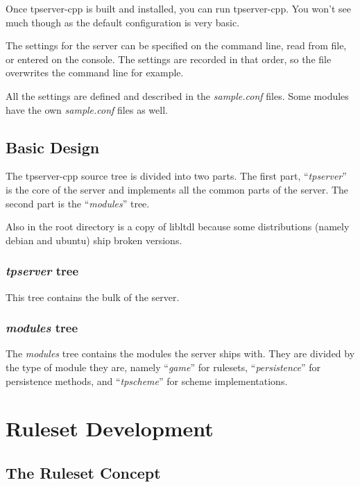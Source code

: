 \documentclass[a4paper,11pt]{report}
\newcommand{\filename}[1]{\emph{#1}}
\begin{document}
Once tpserver-cpp is built and installed, you can run tpserver-cpp.  You won't see much though as the default configuration is very basic.

The settings for the server can be specified on the command line, read from file, or entered on the console. The settings are recorded in that order, so the file overwrites the command line for example.

All the settings are defined and described in the \filename{sample.conf} files. Some modules have the own \filename{sample.conf} files as well.

\chapter{Basic Design}
\label{chap:design-basic}

The tpserver-cpp source tree is divided into two parts. The first part, ``\filename{tpserver}'' is the core of the server and implements all the common parts of the server. The second part is the ``\filename{modules}'' tree.

Also in the root directory is a copy of libltdl because some distributions (namely debian and ubuntu) ship broken versions.

\section{\filename{tpserver} tree}
\label{sec:tree-tpserver}

This tree contains the bulk of the server.

\section{\filename{modules} tree}
\label{sec:tree-modules}

The \filename{modules} tree contains the modules the server ships with. They are divided by the type of module they are, namely ``\filename{game}'' for rulesets, ``\filename{persistence}'' for persistence methods, and ``\filename{tpscheme}'' for scheme implementations.

\part{Ruleset Development}
\label{part:ruleset-dev}

\chapter{The Ruleset Concept}
\label{chap:ruleset-concept}
\end{document}
